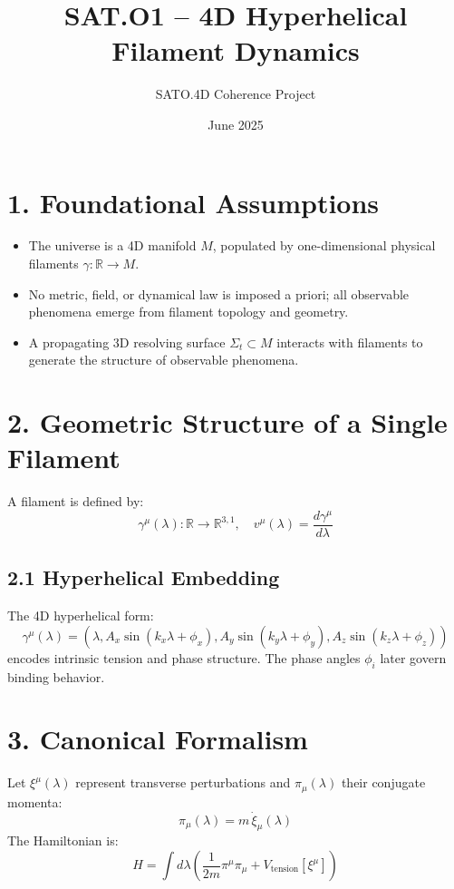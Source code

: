 \documentclass[12pt]{article}
\title{SAT.O1 – 4D Hyperhelical Filament Dynamics}
\author{SATO.4D Coherence Project}
\date{June 2025}
\begin{document}
\maketitle

\section*{1. Foundational Assumptions}

\begin{itemize}
    \item The universe is a 4D manifold \( M \), populated by one-dimensional physical filaments \( \gamma: \mathbb{R} \to M \).
    \item No metric, field, or dynamical law is imposed a priori; all observable phenomena emerge from filament topology and geometry.
    \item A propagating 3D resolving surface \( \Sigma_t \subset M \) interacts with filaments to generate the structure of observable phenomena.
\end{itemize}

\section*{2. Geometric Structure of a Single Filament}

A filament is defined by:
\[
\gamma^\mu(\lambda): \mathbb{R} \rightarrow \mathbb{R}^{3,1}, \quad v^\mu(\lambda) = \frac{d\gamma^\mu}{d\lambda}
\]

\subsection*{2.1 Hyperhelical Embedding}

The 4D hyperhelical form:
\[
\gamma^\mu(\lambda) = \left( \lambda, A_x \sin(k_x \lambda + \phi_x), A_y \sin(k_y \lambda + \phi_y), A_z \sin(k_z \lambda + \phi_z) \right)
\]
encodes intrinsic tension and phase structure. The phase angles \( \phi_i \) later govern binding behavior.

\section*{3. Canonical Formalism}

Let \( \xi^\mu(\lambda) \) represent transverse perturbations and \( \pi_\mu(\lambda) \) their conjugate momenta:
\[
\pi_\mu(\lambda) = m \, \dot{\xi}_\mu(\lambda)
\]
The Hamiltonian is:
\[
H = \int d\lambda \left( \frac{1}{2m} \pi^\mu \pi_\mu + V_{\text{tension}}[\xi^\mu] \right)
\]
\end{document}
